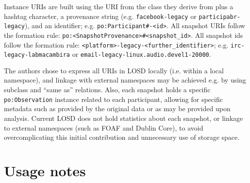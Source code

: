 \documentclass[data,datadescriptor,submit,moreauthors,pdftex]{Definitions/mdpi}
\newcommand{\te}[1] {\texttt{\footnotesize#1}}
\begin{document}
Instance URIs are built using the URI from the class they derive from plus a hashtag character,
a provenance string (e.g. \te{facebook-legacy} or
\te{participabr-legacy}), and an identifier;
e.g. \te{po:Participant\#<provenance-legacy>-<id>}.
All snapshot URIs follow the formation rule: \te{po:<SnapshotProvenance>\#<snapshot\_id>}.
All snapshot ids follow the formation rule: \te{<platform>-legacy-<further\_identifier>}; e.g.
\te{irc-legacy-labmacambira} or
\te{email-legacy-linux.audio.devel1-20000}.

The authors chose to express all URIs in LOSD locally (i.e. within a local namespace), and linkage with external namespaces may be achieved e.g. by using subclass and ``same as'' relations.
Also, each snapshot holds a specific \te{po:Observation} instance related to each participant,
allowing for specific metadata such as provided by the original data or as may be provided upon analysis.
Current LOSD does not hold statistics about each snapshot, or linkage to external namespaces (such as FOAF and Dublin Core),
to avoid overcomplicating this initial contribution and unnecessary use of storage space.

\section{Usage notes}\label{usage}
\end{document}
